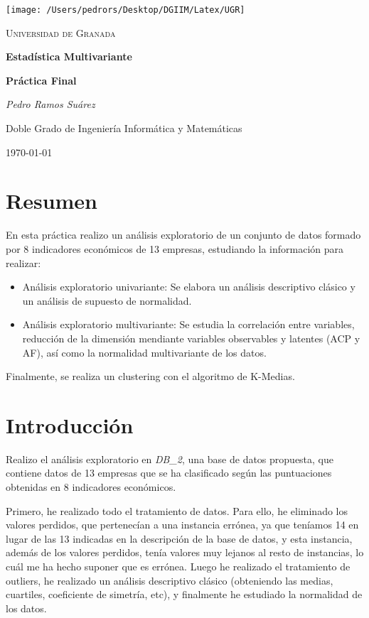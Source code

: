 \documentclass[11pt,a4paper]{article}
\begin{document}
\begin{titlepage}
\centering
\texttt{[image: /Users/pedrors/Desktop/DGIIM/Latex/UGR]}\par\vspace{1cm}
{\scshape\LARGE Universidad de Granada \par}
\vspace{1cm}
\vspace{1.5cm}
{\huge\bfseries Estadística Multivariante\par}
\vspace{1cm}
{\large\bfseries Práctica Final\par}
\vspace{2cm}
{\Large\itshape Pedro Ramos Suárez\par}
\vfill
Doble Grado de Ingeniería Informática y Matemáticas
\vfill
{\large \today\par}
\end{titlepage}

\tableofcontents
\newpage
\section{Resumen}
En esta práctica realizo un análisis exploratorio de un conjunto de datos formado por 8 indicadores económicos de 13 empresas, estudiando la información para realizar:
\begin{itemize}
	\item Análisis exploratorio univariante: Se elabora un análisis descriptivo clásico y un análisis de supuesto de normalidad.
	\item Análisis exploratorio multivariante: Se estudia la correlación entre variables, reducción de la dimensión mendiante variables observables y latentes (ACP y AF), así como la normalidad multivariante de los datos.
\end{itemize}

Finalmente, se realiza un clustering con el algoritmo de K-Medias.

\section{Introducción}
Realizo el análisis exploratorio en \emph{DB\_2}, una base de datos propuesta, que contiene datos de 13 empresas que se ha clasificado según las puntuaciones obtenidas en 8 indicadores económicos.

Primero, he realizado todo el tratamiento de datos. Para ello, he eliminado los valores perdidos, que pertenecían a una instancia errónea, ya que teníamos 14 en lugar de las 13 indicadas en la descripción de la base de datos, y esta instancia, además de los valores perdidos, tenía valores muy lejanos al resto de instancias, lo cuál me ha hecho suponer que es errónea. Luego he realizado el tratamiento de outliers, he realizado un análisis descriptivo clásico (obteniendo las medias, cuartiles, coeficiente de simetría, etc), y finalmente he estudiado la normalidad de los datos.
\end{document}
